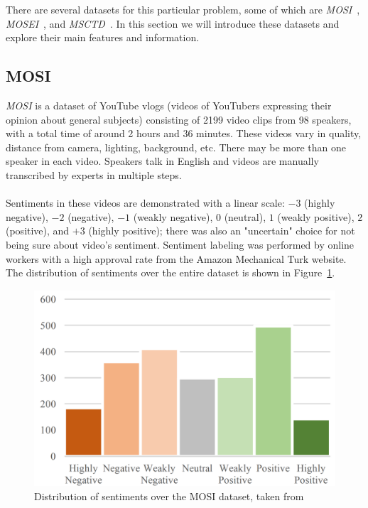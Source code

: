There are several datasets for this particular problem, some of which are \textit{MOSI}~\cite{zadeh2016mosi},  \textit{MOSEI}~\cite{zadeh2018multimodal}, and \textit{MSCTD}~\cite{liang2022msctd}. In this section we will introduce these datasets and explore their main features and information.


\subsection{MOSI}
\textit{MOSI} is a dataset of YouTube vlogs (videos of YouTubers expressing their opinion about general subjects) consisting of 2199 video clips from 98 speakers, with a total time of around 2 hours and 36 minutes. These videos vary in quality, distance from camera, lighting, background, etc. There may be more than one speaker in each video. Speakers talk in English and videos are manually transcribed by experts in multiple steps. 

\paragraph{} Sentiments in these videos are demonstrated with a linear scale: $-3$ (highly negative), $-2$ (negative), $-1$ (weakly negative), $0$ (neutral), $1$ (weakly positive), $2$ (positive), and $+3$ (highly positive); there was also an "uncertain" choice for not being sure about video's sentiment. Sentiment labeling was performed by online workers with a high approval rate from the Amazon Mechanical Turk website. The distribution of sentiments over the entire dataset is shown in Figure~\ref{fig:MOSIhist}.

\begin{figure}[t]
   \centering
   \includegraphics[width=\linewidth]{fig/MOSIhist}
    \caption{Distribution of sentiments over the MOSI dataset, taken from~\cite{zadeh2016mosi}}
    \label{fig:MOSIhist}
\end{figure}

